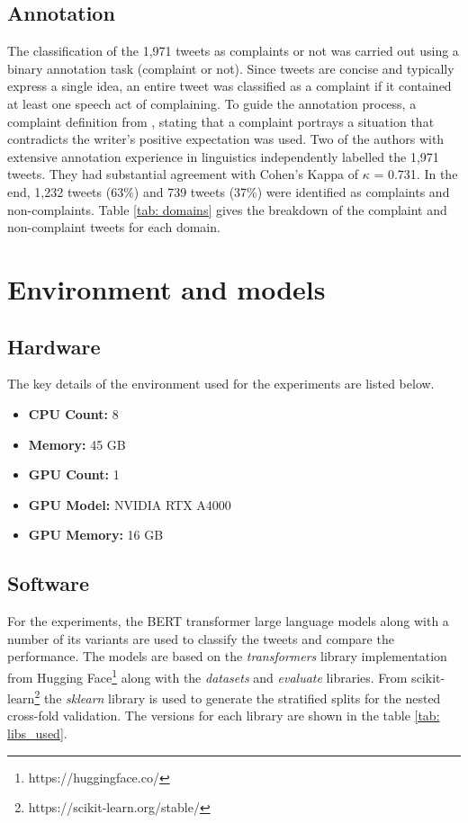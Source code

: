 \subsection{Annotation}
The classification of the 1,971 tweets as complaints or not was carried out using a binary annotation task (complaint or not). Since tweets are concise and typically express a single idea, an entire tweet was classified as a complaint if it contained at least one speech act of complaining. To guide the annotation process, a complaint definition from \cite{olshtain_speechact_1987}, stating that a complaint portrays a situation that contradicts the writer's positive expectation was used. Two of the authors with extensive annotation experience in linguistics independently labelled the 1,971 tweets. They had substantial agreement \cite{artsteinInterCoderAgreementComputational2008} with Cohen's Kappa of $\kappa$ = 0.731. In the end, 1,232 tweets (63\%) and 739 tweets (37\%) were identified as complaints and non-complaints. Table \ref{tab: domains} gives the breakdown of the complaint and non-complaint tweets for each domain.

\section{Environment and models}

\subsection{Hardware}
The key details of the environment used for the experiments are listed below.
\begin{itemize}
    \small
    \item \textbf{CPU Count:} 8
    \item \textbf{Memory:} 45 GB
    \item \textbf{GPU Count:} 1
    \item \textbf{GPU Model:} NVIDIA RTX A4000
    \item \textbf{GPU Memory:} 16 GB
\end{itemize}

\subsection{Software}
For the experiments, the BERT transformer large language models along with a number of its variants are used to classify the tweets and compare the performance. The models are based on the \textit{transformers} library implementation from Hugging Face\footnote{https://huggingface.co/} along with the \textit{datasets} and \textit{evaluate} libraries. From scikit-learn\footnote{https://scikit-learn.org/stable/} the \textit{sklearn} library is used to generate the stratified splits for the nested cross-fold validation. The versions for each library are shown in the table \ref{tab: libs_used}.

